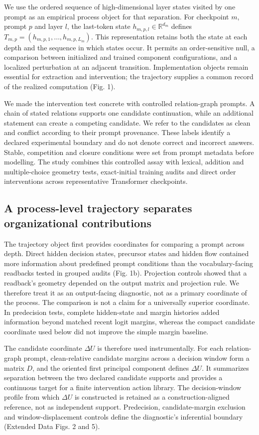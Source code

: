 \documentclass[12pt]{article}
\begin{document}
We use the ordered sequence of high-dimensional layer states visited by one prompt as an empirical process object for that separation. For checkpoint \(m\), prompt \(p\) and layer \(l\), the last-token state \(h_{m,p,l}\in\mathbb{R}^{d_m}\) defines \(T_{m,p}=(h_{m,p,1},\ldots,h_{m,p,L_m})\). This representation retains both the state at each depth and the sequence in which states occur. It permits an order-sensitive null, a comparison between initialized and trained component configurations, and a localized perturbation at an adjacent transition. Implementation objects remain essential for extraction and intervention; the trajectory supplies a common record of the realized computation (Fig. 1).

We made the intervention test concrete with controlled relation-graph prompts. A chain of stated relations supports one candidate continuation, while an additional statement can create a competing candidate. We refer to the candidates as clean and conflict according to their prompt provenance. These labels identify a declared experimental boundary and do not denote correct and incorrect answers. Stable, competition and closure conditions were set from prompt metadata before modelling. The study combines this controlled assay with lexical, addition and multiple-choice geometry tests, exact-initial training audits and direct order interventions across representative Transformer checkpoints.

\subsection*{A process-level trajectory separates organizational contributions}

The trajectory object first provides coordinates for comparing a prompt across depth. Direct hidden decision states, precursor states and hidden flow contained more information about predefined prompt conditions than the vocabulary-facing readbacks tested in grouped audits (Fig. 1b). Projection controls showed that a readback's geometry depended on the output matrix and projection rule. We therefore treat it as an output-facing diagnostic, not as a primary coordinate of the process. The comparison is not a claim for a universally superior coordinate. In predecision tests, complete hidden-state and margin histories added information beyond matched recent logit margins, whereas the compact candidate coordinate used below did not improve the simple margin baseline.

The candidate coordinate \(\Delta U\) is therefore used instrumentally. For each relation-graph prompt, clean-relative candidate margins across a decision window form a matrix \(D\), and the oriented first principal component defines \(\Delta U\). It summarizes separation between the two declared candidate supports and provides a continuous target for a finite intervention action library. The decision-window profile from which \(\Delta U\) is constructed is retained as a construction-aligned reference, not as independent support. Predecision, candidate-margin exclusion and window-displacement controls define the diagnostic's inferential boundary (Extended Data Figs. 2 and 5).
\end{document}
